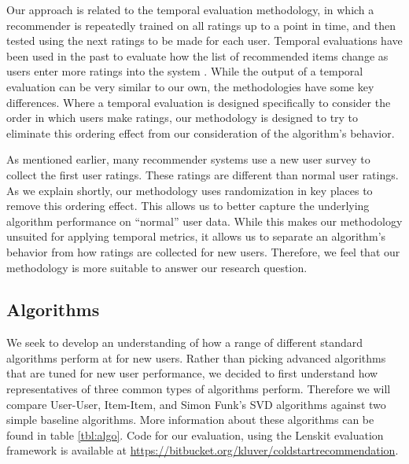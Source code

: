 \documentclass[letterpaper]{sig-alternate}
\begin{document}
  Our approach is related to the temporal evaluation methodology, in which a recommender is repeatedly trained on all ratings up to a point in time, and then tested using the next ratings to be made for each user.
  Temporal evaluations have been used in the past to evaluate how the list of recommended items change as users enter more ratings into the system \cite{LathiaTemporal}.
  While the output of a temporal evaluation can be very similar to our own, the methodologies have some key differences.
  Where a temporal evaluation is designed specifically to consider the order in which users make ratings, our methodology is designed to try to eliminate this ordering effect from our consideration of the algorithm's behavior.

  As mentioned earlier, many recommender systems use a new user survey to collect the first user ratings.
  These ratings are different than normal user ratings.
  As we explain shortly, our methodology uses randomization in key places to remove this ordering effect.
  This allows us to better capture the underlying algorithm performance on ``normal'' user data.
  While this makes our methodology unsuited for applying temporal metrics, it allows us to separate an algorithm's behavior from how ratings are collected for new users.
  Therefore, we feel that our methodology is more suitable to answer our research question.

  \subsection*{Algorithms}

  We seek to develop an understanding of how a range of different standard algorithms perform at for new users.
  Rather than picking advanced algorithms that are tuned for new user performance, we decided to first understand how representatives of three common types of algorithms perform.
  Therefore we will compare User-User\cite{resnick1994grouplens}, Item-Item\cite{sarwar2001item}, and Simon Funk's SVD\cite{funk_netflix_2006} algorithms against two simple baseline algorithms.
  More information about these algorithms can be found in table \ref{tbl:algo}.
  Code for our evaluation, using the Lenskit evaluation framework \cite{lenskit} is available at \url{https://bitbucket.org/kluver/coldstartrecommendation}.
  
\end{document}
